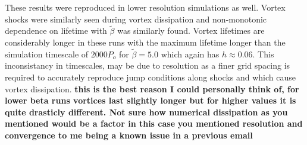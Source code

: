 These results were reproduced in lower resolution simulations as well. Vortex
shocks were similarly seen during vortex dissipation and non-monotonic
 dependence on lifetime with $\tilde\beta$ was similarly found.
Vortex lifetimes are considerably longer in these runs with the maximum
 lifetime longer than the simulation timescale of $2000P_o$ for 
$\tilde\beta=5.0$ which again has $h\approx0.06$.
This inconsistancy in timescales, may be due to resolution as a finer 
grid spacing is required to accurately
reproduce jump conditions along shocks and which cause vortex dissipation.
 {\bf this is the best reason I could personally think of, for lower
   beta runs vortices last slightly longer but for higher values it is
   quite drasticly different. Not sure how numerical dissipation as
   you mentioned would be a factor in this case} 
{\bf you mentioned resolution and convergence to me being a known issue in a previous email}









